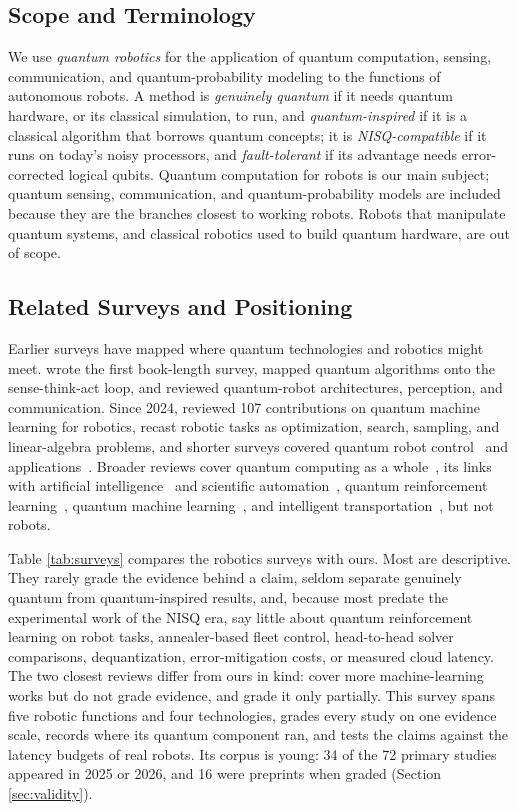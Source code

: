 \documentclass[acmsmall,screen,review]{acmart}
\begin{document}
\subsection{Scope and Terminology}\label{sec:scope}
We use \emph{quantum robotics} for the application of quantum computation, sensing, communication, and quantum-probability modeling to the functions of autonomous robots. A method is \emph{genuinely quantum} if it needs quantum hardware, or its classical simulation, to run, and \emph{quantum-inspired} if it is a classical algorithm that borrows quantum concepts; it is \emph{NISQ-compatible} if it runs on today's noisy processors, and \emph{fault-tolerant} if its advantage needs error-corrected logical qubits. Quantum computation for robots is our main subject; quantum sensing, communication, and quantum-probability models are included because they are the branches closest to working robots. Robots that manipulate quantum systems, and classical robotics used to build quantum hardware, are out of scope.

\subsection{Related Surveys and Positioning}\label{sec:related}
Earlier surveys have mapped where quantum technologies and robotics might meet. \citet{Tandon2017} wrote the first book-length survey, \citet{Petschnigg2019} mapped quantum algorithms onto the sense-think-act loop, and \citet{Yan2024} reviewed quantum-robot architectures, perception, and communication. Since 2024, \citet{Nigatu2026} reviewed 107 contributions on quantum machine learning for robotics, \citet{Udekwe2025} recast robotic tasks as optimization, search, sampling, and linear-algebra problems, and shorter surveys covered quantum robot control~\cite{Fazilat2025a} and applications~\cite{Haldorai2024}. Broader reviews cover quantum computing as a whole~\cite{Gill2022}, its links with artificial intelligence~\cite{GarciaPineda2026} and scientific automation~\cite{Kadowaki2025}, quantum reinforcement learning~\cite{Meyer2022,Kaldari2025}, quantum machine learning~\cite{Wang2024,RodriguezDiaz2025}, and intelligent transportation~\cite{Zhuang2024}, but not robots.

Table \ref{tab:surveys} compares the robotics surveys with ours. Most are descriptive. They rarely grade the evidence behind a claim, seldom separate genuinely quantum from quantum-inspired results, and, because most predate the experimental work of the NISQ era, say little about quantum reinforcement learning on robot tasks, annealer-based fleet control, head-to-head solver comparisons, dequantization, error-mitigation costs, or measured cloud latency. The two closest reviews differ from ours in kind: \citet{Nigatu2026} cover more machine-learning works but do not grade evidence, and \citet{Udekwe2025} grade it only partially. This survey spans five robotic functions and four technologies, grades every study on one evidence scale, records where its quantum component ran, and tests the claims against the latency budgets of real robots. Its corpus is young: 34 of the 72 primary studies appeared in 2025 or 2026, and 16 were preprints when graded (Section \ref{sec:validity}).
\end{document}
